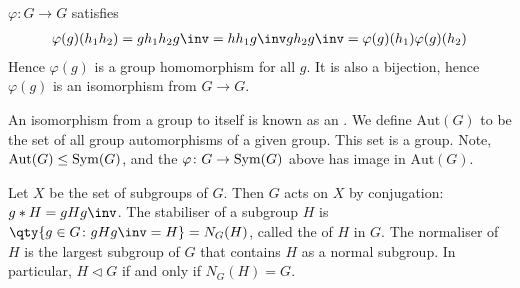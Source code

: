 \begin{remark}
	$\varphi \colon G \to G$ satisfies
	\begin{align*}
		\varphi(g)(h_1 h_2) = g h_1 h_2 g\inv = h h_1 g\inv g h_2 g\inv = \varphi(g)(h_1) \varphi(g)(h_2)
	\end{align*}
	Hence $\varphi(g)$ is a group homomorphism for all $g$.
	It is also a bijection, hence $\varphi(g)$ is an isomorphism from $G \to G$.
\end{remark}

\begin{definition}[Automorphism]
	An isomorphism from a group to itself is known as an .
	We define $\mathrm{Aut}(G)$ to be the set of all group automorphisms of a given group.
	This set is a group.
	Note, $\mathrm{Aut}(G) \leq \operatorname{Sym}(G)$, and the $\varphi \colon G \to \operatorname{Sym}(G)$ above has image in $\mathrm{Aut}(G)$.
\end{definition}

\begin{example}
	Let $X$ be the set of subgroups of $G$.
	Then $G$ acts on $X$ by conjugation: $g \ast H = g H g\inv$.
	The stabiliser of a subgroup $H$ is $\qty{ g \in G \colon gHg\inv = H } = N_G(H)$, called the  of $H$ in $G$.
	The normaliser of $H$ is the largest subgroup of $G$ that contains $H$ as a normal subgroup.
	In particular, $H \triangleleft G$ if and only if $N_G(H) = G$.
\end{example}
